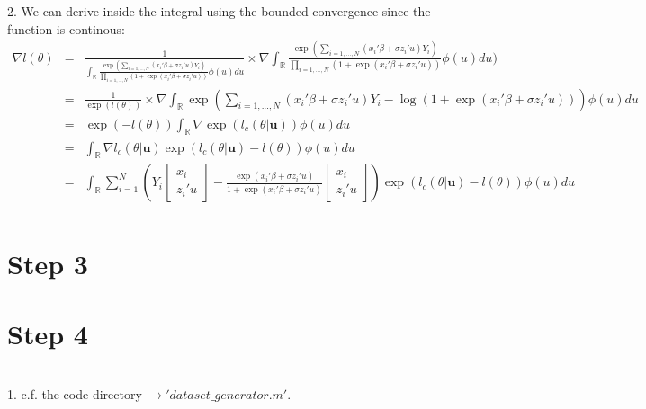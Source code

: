 	2.  We can derive inside the integral using the bounded convergence since the function is continous:
	\begin{eqnarray*}
		\nabla l(\theta)&=& \frac{1}{\int_{\mathbb{R}} \frac{\exp(\sum_{i=1,\dots,N}(x_i' \beta + \sigma z_i'u) Y_i)}{\prod_{i=1,\dots,N}(1+\exp(x_i' \beta + \sigma z_i'u))} \phi(u) du} \times \nabla \int_{\mathbb{R}} \frac{\exp(\sum_{i=1,\dots,N}(x_i' \beta + \sigma z_i'u) Y_i)}{\prod_{i=1,\dots,N}(1+\exp(x_i' \beta + \sigma z_i'u))} \phi(u) du)\\
							&=& \frac{1}{\exp(l(\theta))}\times \nabla \int_{\mathbb{R}} \exp(\sum_{i=1,\dots,N}(x_i' \beta + \sigma z_i'u) Y_i-\log(1+\exp(x_i' \beta + \sigma z_i'u)))\phi(u)du \\
							&=& \exp(-l(\theta)) \int_{\mathbb{R}} \nabla \exp(l_c(\theta\vert \textbf{u})) \phi(u) du\\
							&=& \int_{\mathbb{R}} \nabla l_c(\theta\vert \textbf{u}) \exp (l_c(\theta\vert \textbf{u})-l(\theta)) \phi(u)du\\
							&=& \int_{\mathbb{R}} \sum_{i=1}^{N} (Y_i\begin{bmatrix}
								x_i\\
								z_i'u
							\end{bmatrix}-\frac{\exp(x_i' \beta + \sigma z_i'u)}{1+\exp(x_i' \beta + \sigma z_i'u)}\begin{bmatrix}
							x_i\\
							z_i'u
						\end{bmatrix}) \exp (l_c(\theta\vert \textbf{u})-l(\theta)) \phi(u)du\\
	\end{eqnarray*}
	
	\section*{Step 3}
	
	\section*{Step 4}
	~\\
	
	1. c.f. the code directory $\rightarrow 'dataset\_generator.m'$.\\
	
